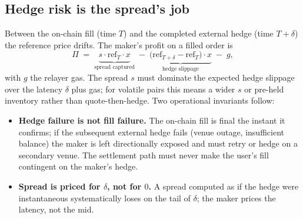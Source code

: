 \subsection{Hedge risk is the spread's job}
\label{sec:rfq-risk}

Between the on-chain fill (time $T$) and the completed external hedge
(time $T+\delta$) the reference price drifts. The maker's profit on a
filled order is
\[
\Pi \;=\; \underbrace{s\cdot \mathrm{ref}_{T}\cdot x}_{\text{spread captured}}
\;-\; \underbrace{\big(\mathrm{ref}_{T+\delta}-\mathrm{ref}_{T}\big)\cdot x}_{\text{hedge slippage}}
\;-\; g,
\]
with $g$ the relayer gas. The spread $s$ must dominate the expected
hedge slippage over the latency $\delta$ plus gas; for volatile pairs
this means a wider $s$ or pre-held inventory rather than
quote-then-hedge. Two operational invariants follow:
\begin{itemize}
  \item \textbf{Hedge failure is not fill failure.} The on-chain fill
  is final the instant it confirms; if the subsequent external hedge
  fails (venue outage, insufficient balance) the maker is left
  directionally exposed and must retry or hedge on a secondary venue.
  The settlement path must never make the user's fill contingent on the
  maker's hedge.
  \item \textbf{Spread is priced for $\delta$, not for $0$.} A spread
  computed as if the hedge were instantaneous systematically loses on
  the tail of $\delta$; the maker prices the latency, not the mid.
\end{itemize}

